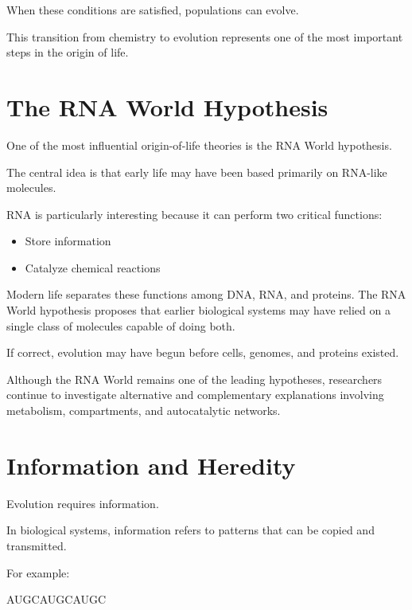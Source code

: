 \documentclass[
  oneside,
  openany]{book}
\newenvironment{Shaded}{\begin{snugshade}}{\end{snugshade}}
\newcommand{\NormalTok}[1]{#1}
\providecommand{\tightlist}{%
  \setlength{\itemsep}{0pt}\setlength{\parskip}{0pt}}
\begin{document}
When these conditions are satisfied, populations can evolve.

This transition from chemistry to evolution represents one of the most important steps in the origin of life.

\section{The RNA World Hypothesis}\label{the-rna-world-hypothesis}

One of the most influential origin-of-life theories is the RNA World hypothesis.

The central idea is that early life may have been based primarily on RNA-like molecules.

RNA is particularly interesting because it can perform two critical functions:

\begin{itemize}
\tightlist
\item
  Store information
\item
  Catalyze chemical reactions
\end{itemize}

Modern life separates these functions among DNA, RNA, and proteins. The RNA World hypothesis proposes that earlier biological systems may have relied on a single class of molecules capable of doing both.

If correct, evolution may have begun before cells, genomes, and proteins existed.

Although the RNA World remains one of the leading hypotheses, researchers continue to investigate alternative and complementary explanations involving metabolism, compartments, and autocatalytic networks.

\section{Information and Heredity}\label{information-and-heredity}

Evolution requires information.

In biological systems, information refers to patterns that can be copied and transmitted.

For example:

\begin{Shaded}
\begin{Highlighting}[]
\NormalTok{AUGCAUGCAUGC}
\end{Highlighting}
\end{Shaded}
\end{document}

